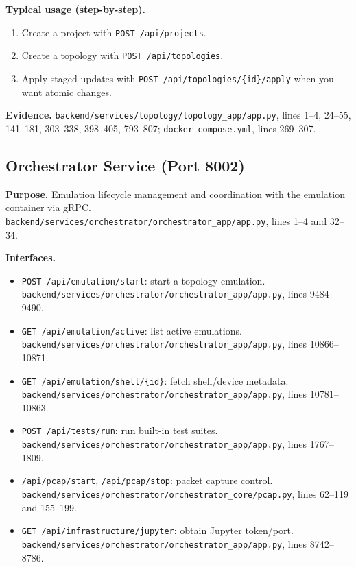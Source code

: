 \documentclass[10pt,a4paper]{article}
\begin{document}
\textbf{Typical usage (step-by-step).}
\begin{enumerate}[leftmargin=*]
\item Create a project with \texttt{POST /api/projects}.
\item Create a topology with \texttt{POST /api/topologies}.
\item Apply staged updates with \texttt{POST /api/topologies/\{id\}/apply} when you want atomic changes.
\end{enumerate}

\textbf{Evidence.} \texttt{backend/services/topology/topology\_app/app.py}, lines 1--4, 24--55, 141--181, 303--338, 398--405, 793--807; \texttt{docker-compose.yml}, lines 269--307.

\subsection{Orchestrator Service (Port 8002)}

\textbf{Purpose.} Emulation lifecycle management and coordination with the emulation container via gRPC. \texttt{backend/services/orchestrator/orchestrator\_app/app.py}, lines 1--4 and 32--34.

\textbf{Interfaces.}
\begin{itemize}[leftmargin=*]
\item \texttt{POST /api/emulation/start}: start a topology emulation. \texttt{backend/services/orchestrator/orchestrator\_app/app.py}, lines 9484--9490.
\item \texttt{GET /api/emulation/active}: list active emulations. \texttt{backend/services/orchestrator/orchestrator\_app/app.py}, lines 10866--10871.
\item \texttt{GET /api/emulation/shell/\{id\}}: fetch shell/device metadata. \texttt{backend/services/orchestrator/orchestrator\_app/app.py}, lines 10781--10863.
\item \texttt{POST /api/tests/run}: run built-in test suites. \texttt{backend/services/orchestrator/orchestrator\_app/app.py}, lines 1767--1809.
\item \texttt{/api/pcap/start}, \texttt{/api/pcap/stop}: packet capture control. \texttt{backend/services/orchestrator/orchestrator\_core/pcap.py}, lines 62--119 and 155--199.
\item \texttt{GET /api/infrastructure/jupyter}: obtain Jupyter token/port. \texttt{backend/services/orchestrator/orchestrator\_app/app.py}, lines 8742--8786.
\end{itemize}
\end{document}
